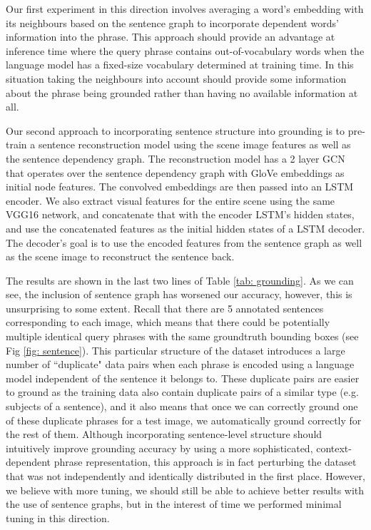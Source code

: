 Our first experiment in this direction involves averaging a word's embedding with its neighbours based on the sentence graph to incorporate dependent words' information into the phrase. This approach should provide an advantage at inference time where the query phrase contains out-of-vocabulary words when the language model has a fixed-size vocabulary determined at training time. In this situation taking the neighbours into account should provide some information about the phrase being grounded rather than having no available information at all. 

Our second approach to incorporating sentence structure into grounding is to pre-train a sentence reconstruction model using the scene image features as well as the sentence dependency graph. The reconstruction model has a 2 layer GCN that operates over the sentence dependency graph with GloVe\cite{pennington2014glove} embeddings as initial node features. The convolved embeddings are then passed into an LSTM encoder. We also extract visual features for the entire scene using the same VGG16\cite{simonyan2014very} network, and concatenate that with the encoder LSTM's hidden states, and use the concatenated features as the initial hidden states of a LSTM decoder. The decoder's goal is to use the encoded features from the sentence graph as well as the scene image to reconstruct the sentence back.

The results are shown in the last two lines of Table \ref{tab: grounding}. As we can see, the inclusion of sentence graph has worsened our accuracy, however, this is unsurprising to some extent. Recall that there are 5 annotated sentences corresponding to each image, which means that there could be potentially multiple identical query phrases with the same groundtruth bounding boxes (see Fig \ref{fig: sentence}). This particular structure of the dataset introduces a large number of ``duplicate" data pairs when each phrase is encoded using a language model independent of the sentence it belongs to. These duplicate pairs are easier to ground as the training data also contain duplicate pairs of a similar type (e.g. subjects of a sentence), and it also means that once we can correctly ground one of these duplicate phrases for a test image, we automatically ground correctly for the rest of them. Although incorporating sentence-level structure should intuitively improve grounding accuracy by using a more sophisticated, context-dependent phrase representation, this approach is in fact perturbing the dataset that was not independently and identically distributed in the first place. However, we believe with more tuning, we should still be able to achieve better results with the use of sentence graphs, but in the interest of time we performed minimal tuning in this direction. 

